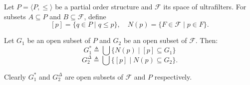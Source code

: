 Let $P = \langle P, \leq \rangle$ be a partial order structure and $\mathcal{F}$ its space of ultrafilters. For subsets $A \subseteq P$ and $B \subseteq \mathcal{F}$, define
$$[p] = \{q \in P \mid q \leq p\}, \quad N(p) = \{F \in \mathcal{F} \mid p \in F\}.$$

Let $G_1$ be an open subset of $P$ and $G_2$ be an open subset of $\mathcal{F}$. Then:
$$G_1^* \triangleq \bigcup \{N(p) \mid [p] \subseteq G_1\}$$
$$G_2^\Delta \triangleq \bigcup \{[p] \mid N(p) \subseteq G_2\}.$$

Clearly $G_1^*$ and $G_2^\Delta$ are open subsets of $\mathcal{F}$ and $P$ respectively.
